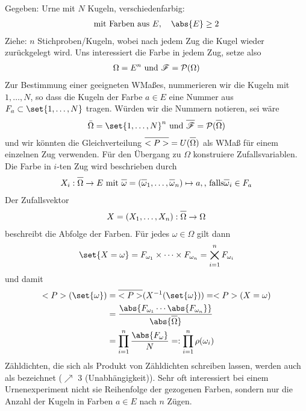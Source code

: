 Gegeben: Urne mit $N$ Kugeln, verschiedenfarbig:
\begin{align}
	\text{mit Farben aus } E, \quad \abs{E} \ge 2\notag
\end{align}
Ziehe: $n$ Stichproben/Kugeln, wobei nach jedem Zug die Kugel wieder zurückgelegt wird. Uns interessiert die Farbe in jedem Zug, setze also
\begin{align}
	\Omega = E^n \text{ und } \mathscr{F} = \mathcal{P}(\Omega) \notag
\end{align}
Zur Bestimmung einer geeigneten WMaßes, nummerieren wir die Kugeln mit $1,\dots, N$, so dass die Kugeln der Farbe $a \in E$ eine Nummer aus $F_{a} \subset \set{1,\dots, N}$ tragen. Würden wir die Nummern notieren, sei wäre
\begin{align}
	\overline{\Omega} = \set{1,\dots, N}^n \und \overline{\sigF} = \pows(\overline{\Omega})\notag
\end{align}
und wir könnten die Gleichverteilung $\overline{\probp} = U(\overline{\Omega})$ als WMaß für einem einzelnen Zug verwenden. Für den Übergang zu $\Omega$ konstruiere Zufallsvariablen. Die Farbe in $i$-ten Zug wird beschrieben durch
\begin{align}
	X_i: \overline{\Omega} \to E \mit \overline{\omega} = (\overline{\omega}_1, \dots, \overline{\omega}_n) \mapsto a, \text{, falls} \overline{\omega}_i \in F_a\notag
\end{align}
Der Zufallsvektor
\begin{align}
	X = (X_1, \dots, X_n): \overline{\Omega} \to \Omega\notag
\end{align}
beschreibt die Abfolge der Farben. Für jedes $\omega \in \Omega$ gilt dann
\begin{align}
	\set{X = \omega} = F_{\omega_1} \times \cdots \times F_{\omega_n} = \bigtimes_{i=1}^{n} F_{\omega_i}\notag
\end{align}
und damit
\begin{align}
	\probp(\set{\omega}) 
	&= \overline{\probp}(X^{-1}(\set{\omega})) = \probp(X=\omega)\notag\\
	&= \frac{\abs{F_{\omega_1} \cdots \abs{F_{\omega_n}}}}{\abs{\overline{\Omega}}}\notag\\
	&= \prod_{i=1}^{n} \frac{\abs{F_{\omega}}}{N} =: \prod_{i=1}^{n} \rho(\omega_i)\notag
\end{align}
Zähldichten, die sich als Produkt von Zähldichten schreiben lassen, werden auch als  bezeichnet ($\nearrow$  3 (Unabhängigkeit)). %
Sehr oft interessiert bei einem Urnenexperiment nicht sie Reihenfolge der gezogenen Farben, sondern nur die Anzahl der Kugeln in Farben $a \in E$ nach $n$ Zügen.
